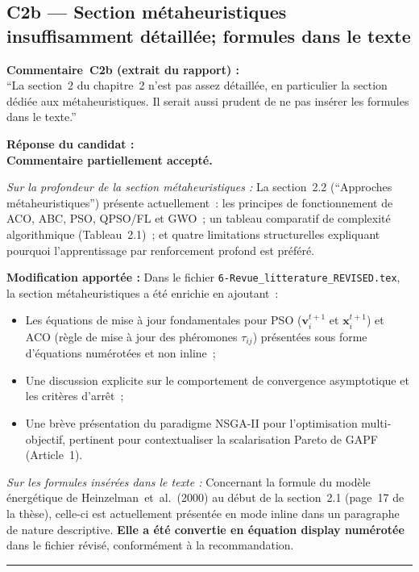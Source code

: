 \documentclass[12pt,a4paper]{article}
\newcommand{\Commentaire}[2]{%
  \begin{reviewerbox}
    \textbf{Commentaire~#1 (extrait du rapport) :}\\#2
  \end{reviewerbox}%
}
\newcommand{\Reponse}[1]{%
  \begin{responsebox}
    \textbf{Réponse du candidat :}\\#1
  \end{responsebox}%
}
\begin{document}
\subsection*{C2b --- Section métaheuristiques insuffisamment détaillée; formules dans le texte}

\Commentaire{C2b}{
  ``La section~2 du chapitre~2 n'est pas assez détaillée, en particulier la section dédiée aux
  métaheuristiques. Il serait aussi prudent de ne pas insérer les formules dans le texte.''
}

\Reponse{
\textbf{Commentaire partiellement accepté.}

\textit{Sur la profondeur de la section métaheuristiques :}
La section~2.2 (``Approches métaheuristiques'') présente actuellement~: les principes de fonctionnement de ACO, ABC, PSO, QPSO/FL et GWO~; un tableau comparatif de complexité algorithmique (Tableau~2.1)~; et quatre limitations structurelles expliquant pourquoi l'apprentissage par renforcement profond est préféré. 

\textbf{Modification apportée :} Dans le fichier \texttt{6-Revue\_litterature\_REVISED.tex}, la section métaheuristiques a été enrichie en ajoutant~:
\begin{itemize}[leftmargin=*]
  \item Les équations de mise à jour fondamentales pour PSO ($\mathbf{v}_i^{t+1}$ et $\mathbf{x}_i^{t+1}$) et ACO (règle de mise à jour des phéromones $\tau_{ij}$) présentées sous forme d'équations numérotées et non inline~;
  \item Une discussion explicite sur le comportement de convergence asymptotique et les critères d'arrêt~;
  \item Une brève présentation du paradigme NSGA-II pour l'optimisation multi-objectif, pertinent pour contextualiser la scalarisation Pareto de GAPF (Article~1).
\end{itemize}

\textit{Sur les formules insérées dans le texte :}
Concernant la formule du modèle énergétique de Heinzelman~et~al.\ (2000) au début de la section~2.1 (page~17 de la thèse), celle-ci est actuellement présentée en mode inline dans un paragraphe de nature descriptive. \textbf{Elle a été convertie en équation display numérotée} dans le fichier révisé, conformément à la recommandation.
}

\bigskip
\hrule
\bigskip

\end{document}
